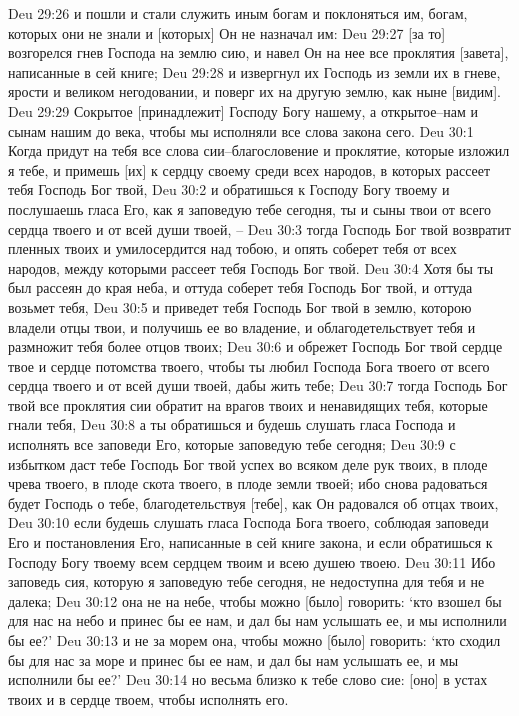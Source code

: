 Deu 29:26  и пошли и стали служить иным богам и поклоняться им, богам, которых они не знали и [которых] Он не назначал им:
Deu 29:27  [за то] возгорелся гнев Господа на землю сию, и навел Он на нее все проклятия [завета], написанные в сей книге;
Deu 29:28  и извергнул их Господь из земли их в гневе, ярости и великом негодовании, и поверг их на другую землю, как ныне [видим].
Deu 29:29  Сокрытое [принадлежит] Господу Богу нашему, а открытое--нам и сынам нашим до века, чтобы мы исполняли все слова закона сего.
Deu 30:1  Когда придут на тебя все слова сии--благословение и проклятие, которые изложил я тебе, и примешь [их] к сердцу своему среди всех народов, в которых рассеет тебя Господь Бог твой,
Deu 30:2  и обратишься к Господу Богу твоему и послушаешь гласа Его, как я заповедую тебе сегодня, ты и сыны твои от всего сердца твоего и от всей души твоей, --
Deu 30:3  тогда Господь Бог твой возвратит пленных твоих и умилосердится над тобою, и опять соберет тебя от всех народов, между которыми рассеет тебя Господь Бог твой.
Deu 30:4  Хотя бы ты был рассеян до края неба, и оттуда соберет тебя Господь Бог твой, и оттуда возьмет тебя,
Deu 30:5  и приведет тебя Господь Бог твой в землю, которою владели отцы твои, и получишь ее во владение, и облагодетельствует тебя и размножит тебя более отцов твоих;
Deu 30:6  и обрежет Господь Бог твой сердце твое и сердце потомства твоего, чтобы ты любил Господа Бога твоего от всего сердца твоего и от всей души твоей, дабы жить тебе;
Deu 30:7  тогда Господь Бог твой все проклятия сии обратит на врагов твоих и ненавидящих тебя, которые гнали тебя,
Deu 30:8  а ты обратишься и будешь слушать гласа Господа и исполнять все заповеди Его, которые заповедую тебе сегодня;
Deu 30:9  с избытком даст тебе Господь Бог твой успех во всяком деле рук твоих, в плоде чрева твоего, в плоде скота твоего, в плоде земли твоей; ибо снова радоваться будет Господь о тебе, благодетельствуя [тебе], как Он радовался об отцах твоих,
Deu 30:10  если будешь слушать гласа Господа Бога твоего, соблюдая заповеди Его и постановления Его, написанные в сей книге закона, и если обратишься к Господу Богу твоему всем сердцем твоим и всею душею твоею.
Deu 30:11  Ибо заповедь сия, которую я заповедую тебе сегодня, не недоступна для тебя и не далека;
Deu 30:12  она не на небе, чтобы можно [было] говорить: `кто взошел бы для нас на небо и принес бы ее нам, и дал бы нам услышать ее, и мы исполнили бы ее?'
Deu 30:13  и не за морем она, чтобы можно [было] говорить: `кто сходил бы для нас за море и принес бы ее нам, и дал бы нам услышать ее, и мы исполнили бы ее?'
Deu 30:14  но весьма близко к тебе слово сие: [оно] в устах твоих и в сердце твоем, чтобы исполнять его.
